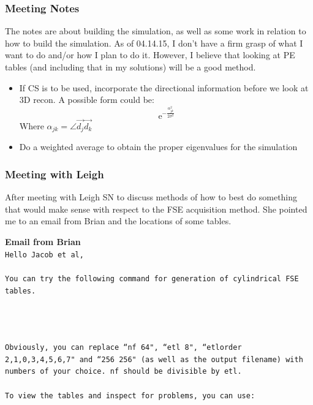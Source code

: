 \documentclass[11 pt]{article}
\newcommand{\me}{\mathrm{e}}
\newcommand{\bo}{\noindent\textbf}
\begin{document}
    \subsubsection{Meeting Notes}
      The notes are about building the simulation, as well as some work in relation to how to build the simulation. As of 04.14.15, I don't have a firm grasp of what I want to do and/or how I plan to do it. However, I believe that looking at PE tables (and including that in my solutions) will be a good method.
      \begin{itemize}
    	  \item If CS is to be used, incorporate the directional information before we look at 3D recon. A possible form could be:\\
    		\[ \me^{-\frac{\alpha_{jk}^2}{2\sigma^2}}\]
    		Where $\alpha_{jk} = \angle\vec{d_j}\vec{d_k}$
    	  \item Do a weighted average to obtain the proper eigenvalues for the simulation \\
        \end{itemize}
    
    \subsubsection{Meeting with Leigh}
      After meeting with Leigh SN to discuss methods of how to best do something that would make sense with respect to the FSE acquisition method. She pointed me to an email from Brian and the locations of some tables. 
      
      \bo{Email from Brian}\\
      	\texttt{Hello Jacob et al,}\\\\
      	  \texttt{You can try the following command for generation of cylindrical FSE tables.}\\\\
           
           \hfill\\\\
      	    \texttt{Obviously, you can replace ``nf 64", ``etl 8", ``etlorder 2,1,0,3,4,5,6,7" and ``256 256" (as well as the output filename) with numbers of your choice. nf should be divisible by etl.}\\\\
            \texttt{To view the tables and inspect for problems, you can use:}\\\\
            
\end{document}

